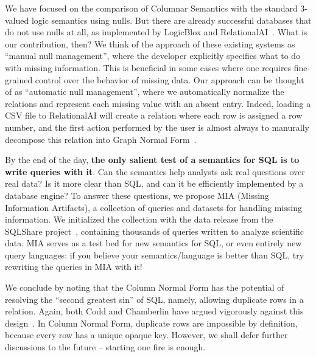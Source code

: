 \documentclass[sigconf]{acmart}
\begin{document}
We have focused on the comparison of Columnar Semantics 
 with the standard 3-valued logic semantics using nulls.
But there are already successful databases
 that do not use nulls at all,
 as implemented by LogicBlox and RelationalAI~\cite{RAIDocumentation,DBLP:conf/sigmod/ArefCGKOPVW15}.
What is our contribution, then?
We think of the approach of these existing systems
 as ``manual null management'', 
 where the developer explicitly specifies what to do with missing information.
This is beneficial in some cases where one requires
 fine-grained control over the behavior of missing data.
Our approach can be thought of as ``automatic null management'',
 where we automatically normalize the relations 
 and represent each missing value with an absent entry.
Indeed, loading a \textsf{CSV} file to RelationalAI 
 will create a relation where each row is assigned a row number, 
 and the first action performed by the user is almost always 
 to manurally decompose this relation into Graph Normal Form~\cite{RAIDocumentation}.

By the end of the day, \textbf{the only salient test of a semantics for SQL
 is to write queries with it}.
Can the semantics help analysts ask real questions 
 over real data?
Is it more clear than SQL, 
 and can it be efficiently implemented by a database engine?
To answer these questions, 
 we propose MIA (Missing Information Artifacts),
 a collection of queries and datasets 
 for handling missing information.
We initialized the collection with the data release 
 from the SQLShare project~\cite{DBLP:conf/sigmod/JainMHHL16},
 containing thousands of queries written to analyze scientific data.
MIA serves as a test bed for new semantics for SQL, 
 or even entirely new query languages:
 if you believe your semantics/language is better than SQL,
 try rewriting the queries in MIA with it!

We conclude by noting that
 the Column Normal Form has the potential of 
 resolving the ``second greatest sin'' of SQL, 
 namely, allowing duplicate rows in a relation.
Again, both Codd and Chamberlin have argued 
 vigorously against this design~\cite{DBLP:books/aw/Codd90,DBLP:conf/sigmod/Chamberlin23}.
In Column Normal Form, 
 duplicate rows are impossible by definition,
 because every row has a unique opaque key.
However, we shall defer further discussions 
 to the future -- starting one fire is enough.



\end{document}
